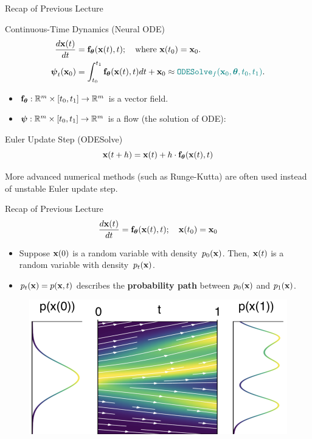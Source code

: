 \documentclass{beamer}
\begin{document}
\begin{frame}{Recap of Previous Lecture}
	\begin{block}{Continuous-Time Dynamics (Neural ODE)}
		\vspace{-0.5cm}
		\begin{align*}
			\frac{d \mathbf{x}(t)}{dt} &= \mathbf{f}_{\boldsymbol{\theta}}(\mathbf{x}(t), t);\quad \text{where } \mathbf{x}(t_0) = \mathbf{x}_0. \\
			\boldsymbol{\psi}_t(\mathbf{x}_0) &= \int^{t_1}_{t_0} \mathbf{f}_{\boldsymbol{\theta}}(\mathbf{x}(t), t) d t  + \mathbf{x}_0 \approx {\color{teal}\texttt{ODESolve}_f(\mathbf{x}_0, \boldsymbol{\theta}, t_0, t_1)}.
		\end{align*}
		\vspace{-0.5cm}
	\end{block}
	\begin{itemize}
		\item $\mathbf{f}_{\boldsymbol{\theta}}: \mathbb{R}^m \times [t_0, t_1] \rightarrow \mathbb{R}^m$ is a vector field.
		\item $\boldsymbol{\psi}: \mathbb{R}^m \times [t_0, t_1] \rightarrow \mathbb{R}^m$ is a flow (the solution of ODE):
	\end{itemize}
	\begin{block}{Euler Update Step (ODESolve)}
		\vspace{-0.3cm}
		\[
  			\mathbf{x}(t + h) = \mathbf{x}(t) + h \cdot \mathbf{f}_{\boldsymbol{\theta}}(\mathbf{x}(t), t)
		\]
	\end{block}
	More advanced numerical methods (such as Runge-Kutta) are often used instead of unstable Euler update step.
\end{frame}
\begin{frame}{Recap of Previous Lecture}
	\vspace{-0.3cm}
	\[
 		\frac{d \mathbf{x}(t)}{dt} = \mathbf{f}_{\boldsymbol{\theta}}(\mathbf{x}(t), t);\quad \mathbf{x}(t_0) = \mathbf{x}_0
	\]
	\vspace{-0.3cm}
	\begin{itemize}
		\item Suppose $\mathbf{x}(0)$ is a random variable with density~$p_0(\mathbf{x})$. Then, $\mathbf{x}(t)$ is a random variable with density~$p_t(\mathbf{x})$.
		\item $p_t(\mathbf{x}) = p(\mathbf{x}, t)$ describes the \textbf{probability path} between $p_0(\mathbf{x})$ and $p_1(\mathbf{x})$.
	\end{itemize}
	\vspace{-0.3cm}
	\begin{figure}
		\centering
		\includegraphics[width=0.7\linewidth]{figs/cnf_flow.png}
	\end{figure}
\end{frame}
\end{document}
